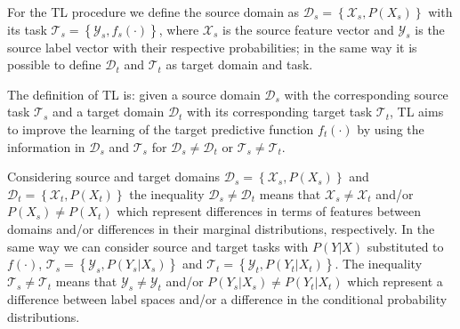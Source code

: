 \documentclass[../main.tex]{subfiles}
\begin{document}
For the TL procedure we define the source domain as $\mathcal{D}_s=\left\{\mathcal{X}_{s}, P(X_{s})\right\}$  with its task $\mathcal{T}_s=\left\{\mathcal{Y}_{s}, f_{s}(\cdot)\right\}$, where $\mathcal{X}_{s}$ is the source feature vector and  $\mathcal{Y}_{s}$ is the source label vector with their respective probabilities; in the same way it is possible to define $\mathcal{D}_t$ and $\mathcal{T}_t$ as target domain and task.

The definition of TL is: given a source domain $\mathcal{D}_s$ with the corresponding source task $\mathcal{T}_s$ and a target domain $\mathcal{D}_t$ with its corresponding target task $\mathcal{T}_t$, TL aims to improve the learning of the target predictive function $f_{t}(\cdot)$ by using the information in $\mathcal{D}_s$ and $\mathcal{T}_s$ for $\mathcal{D}_s\not=\mathcal{D}_t$ or $\mathcal{T}_s\not=\mathcal{T}_t$.

Considering source and target domains $\mathcal{D}_s=\left\{\mathcal{X}_{s}, P(X_{s})\right\}$ and  $\mathcal{D}_t=\left\{\mathcal{X}_{t}, P(X_{t})\right\}$ the inequality $\mathcal{D}_s\not=\mathcal{D}_t$ means that $\mathcal{X}_{s} \not= \mathcal{X}_{t}$ and/or $P(X_{s}) \not= P(X_{t})$ which represent differences in terms of features between domains and/or differences in their marginal distributions, respectively. 
In the same way we can consider source and target tasks with $P(Y|X)$ substituted to $f(\cdot)$, $\mathcal{T}_s=\left\{\mathcal{Y}_{s}, P(Y_{s}|X_{s})\right\}$ and $\mathcal{T}_t=\left\{\mathcal{Y}_{t}, P(Y_{t}|X_{t})\right\}$.
The inequality $\mathcal{T}_s\not=\mathcal{T}_t$ means that  $\mathcal{Y}_{s} \not= \mathcal{Y}_{t}$ and/or $P(Y_{s}|X_{s}) \not= P(Y_{t}|X_{t})$ which represent a difference between label spaces and/or a difference in the conditional probability distributions.
\end{document}
